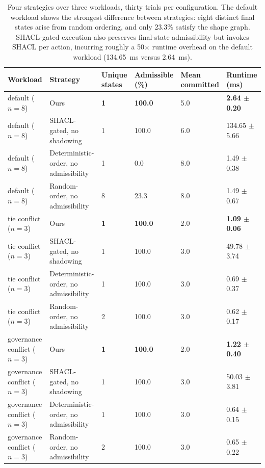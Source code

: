 \documentclass{ieeeaccess}
\theoremstyle{definition}
\theoremstyle{plain}
\theoremstyle{remark}
\begin{document}
\begin{table}[t]
\caption{Four strategies over three workloads, thirty trials per configuration. The default workload shows the strongest difference between strategies: eight distinct final states arise from random ordering, and only 23.3\% satisfy the shape graph. SHACL-gated execution also preserves final-state admissibility but invokes SHACL per action, incurring roughly a 50$\times$ runtime overhead on the default workload (134.65~ms versus 2.64~ms).}
\label{tab:baseline}
\centering
\small
\begin{tabular}{|p{3.2cm}|p{4.4cm}|p{1.5cm}|p{1.8cm}|p{1.8cm}|p{2.2cm}|}
\hline
\textbf{Workload} & \textbf{Strategy} & \textbf{Unique states} & \textbf{Admissible (\%)} & \textbf{Mean committed} & \textbf{Runtime (ms)} \\
\hline
default ($n{=}8$)             & Ours                                  & \textbf{1} & \textbf{100.0} & 5.0 & \textbf{2.64 $\pm$ 0.20} \\
\hline
default ($n{=}8$)             & SHACL-gated, no shadowing             & 1          & 100.0          & 6.0 & 134.65 $\pm$ 5.66 \\
\hline
default ($n{=}8$)             & Deterministic-order, no admissibility & 1          & 0.0            & 8.0 & 1.49 $\pm$ 0.38 \\
\hline
default ($n{=}8$)             & Random-order, no admissibility        & 8          & 23.3           & 8.0 & 1.49 $\pm$ 0.67 \\
\hline
tie conflict ($n{=}3$)        & Ours                                  & \textbf{1} & \textbf{100.0} & 2.0 & \textbf{1.09 $\pm$ 0.06} \\
\hline
tie conflict ($n{=}3$)        & SHACL-gated, no shadowing             & 1          & 100.0          & 3.0 & 49.78 $\pm$ 3.74 \\
\hline
tie conflict ($n{=}3$)        & Deterministic-order, no admissibility & 1          & 100.0          & 3.0 & 0.69 $\pm$ 0.37 \\
\hline
tie conflict ($n{=}3$)        & Random-order, no admissibility        & 2          & 100.0          & 3.0 & 0.62 $\pm$ 0.17 \\
\hline
governance conflict ($n{=}3$) & Ours                                  & \textbf{1} & \textbf{100.0} & 2.0 & \textbf{1.22 $\pm$ 0.40} \\
\hline
governance conflict ($n{=}3$) & SHACL-gated, no shadowing             & 1          & 100.0          & 3.0 & 50.03 $\pm$ 3.81 \\
\hline
governance conflict ($n{=}3$) & Deterministic-order, no admissibility & 1          & 100.0          & 3.0 & 0.64 $\pm$ 0.15 \\
\hline
governance conflict ($n{=}3$) & Random-order, no admissibility        & 2          & 100.0          & 3.0 & 0.65 $\pm$ 0.22 \\
\hline
\end{tabular}
\end{table}
\end{document}
